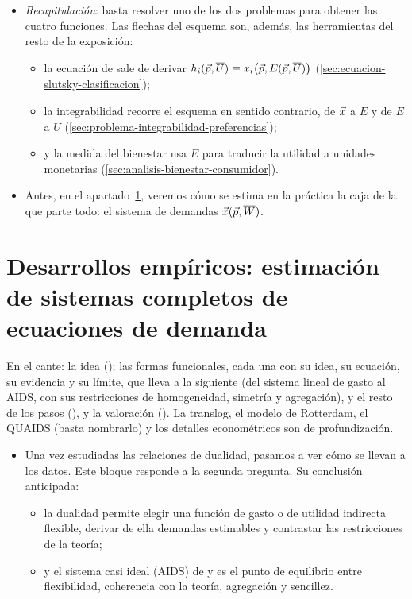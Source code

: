 \documentclass[11pt]{article}
\begin{document}
\begin{itemize}
\item \emph{Recapitulación}: basta resolver uno de los dos problemas para obtener las cuatro funciones. Las flechas del esquema son, además, las herramientas del resto de la exposición:
  \begin{itemize}
  \item la ecuación de  sale de derivar $h_i(\vec{p},\overline{U})\equiv x_i\big(\vec{p},E(\vec{p},\overline{U})\big)$ (\ref{sec:ecuacion-slutsky-clasificacion});
  \item la integrabilidad recorre el esquema en sentido contrario, de $\vec{x}$ a $E$ y de $E$ a $U$ (\ref{sec:problema-integrabilidad-preferencias});
  \item y la medida del bienestar usa $E$ para traducir la utilidad a unidades monetarias (\ref{sec:analisis-bienestar-consumidor}).
  \end{itemize}
\item Antes, en el apartado~\ref{sec:desarrollos-empiricos-estimacion}, veremos cómo se estima en la práctica la caja de la que parte todo: el sistema de demandas $\vec{x}(\vec{p},\overline{W})$.
\end{itemize}


\section{Desarrollos empíricos:\cortetitulo{} estimación de sistemas completos de ecuaciones de demanda}\label{sec:desarrollos-empiricos-estimacion}

\begin{notaopositor}
En el cante: la idea (); las formas funcionales, cada una con su idea, su ecuación, su evidencia y su límite, que lleva a la siguiente (del sistema lineal de gasto al AIDS, con sus restricciones de homogeneidad, simetría y agregación), y el resto de los pasos (), y la valoración (). La translog, el modelo de Rotterdam, el QUAIDS (basta nombrarlo) y los detalles econométricos son de profundización.
\end{notaopositor}

\begin{itemize}
\item Una vez estudiadas las relaciones de dualidad, pasamos a ver cómo se llevan a los datos. Este bloque responde a la segunda pregunta. Su conclusión anticipada:
  \begin{itemize}
  \item la dualidad permite elegir una función de gasto o de utilidad indirecta flexible, derivar de ella demandas estimables y contrastar las restricciones de la teoría;
  \item y el sistema casi ideal (AIDS) de  y  es el punto de equilibrio entre flexibilidad, coherencia con la teoría, agregación y sencillez.
  \end{itemize}
\end{itemize}
\end{document}
